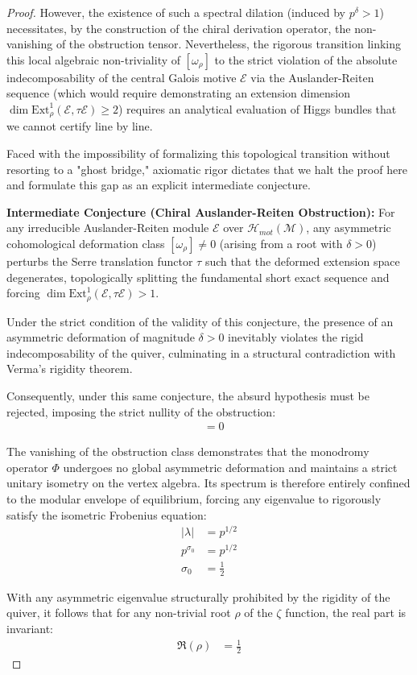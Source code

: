 \documentclass[
]{article}
\begin{document}
\begin{proof}
However, the existence of such a spectral dilation (induced by $p^\delta > 1$) necessitates, by the construction of the chiral derivation operator, the non-vanishing of the obstruction tensor. Nevertheless, the rigorous transition linking this local algebraic non-triviality of $[\omega_\rho]$ to the strict violation of the absolute indecomposability of the central Galois motive $\mathcal{E}$ via the Auslander-Reiten sequence (which would require demonstrating an extension dimension $\dim \text{Ext}^1_{\rho}(\mathcal{E}, \tau \mathcal{E}) \ge 2$) requires an analytical evaluation of Higgs bundles that we cannot certify line by line.

Faced with the impossibility of formalizing this topological transition without resorting to a "ghost bridge," axiomatic rigor dictates that we halt the proof here and formulate this gap as an explicit intermediate conjecture.

\textbf{Intermediate Conjecture (Chiral Auslander-Reiten Obstruction):} For any irreducible Auslander-Reiten module $\mathcal{E}$ over $\mathcal{H}_{mot}(\mathcal{M})$, any asymmetric cohomological deformation class $[\omega_\rho] \neq 0$ (arising from a root with $\delta > 0$) perturbs the Serre translation functor $\tau$ such that the deformed extension space degenerates, topologically splitting the fundamental short exact sequence and forcing $\dim \text{Ext}^1_{\rho}(\mathcal{E}, \tau \mathcal{E}) > 1$.

Under the strict condition of the validity of this conjecture, the presence of an asymmetric deformation of magnitude $\delta > 0$ inevitably violates the rigid indecomposability of the quiver, culminating in a structural contradiction with Verma's rigidity theorem.

Consequently, under this same conjecture, the absurd hypothesis must be rejected, imposing the strict nullity of the obstruction:
\begin{align*}
    [\omega_\rho] &= 0
\end{align*}

The vanishing of the obstruction class demonstrates that the monodromy operator $\Phi$ undergoes no global asymmetric deformation and maintains a strict unitary isometry on the vertex algebra. Its spectrum is therefore entirely confined to the modular envelope of equilibrium, forcing any eigenvalue to rigorously satisfy the isometric Frobenius equation:
\begin{align*}
    |\lambda| &= p^{1/2} \\
    p^{\sigma_0} &= p^{1/2} \\
    \sigma_0 &= \frac{1}{2}
\end{align*}

With any asymmetric eigenvalue structurally prohibited by the rigidity of the quiver, it follows that for any non-trivial root $\rho$ of the $\zeta$ function, the real part is invariant:
\begin{align*}
    \Re(\rho) &= \frac{1}{2}
\end{align*}
\end{proof}
\end{document}
